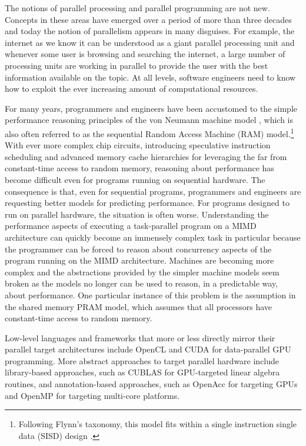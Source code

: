 \documentclass[oneside,11pt]{book}
\begin{document}
The notions of parallel processing and parallel programming are not
new. Concepts in these areas have emerged over a period of more than three
decades and today the notion of parallelism appears in many
disguises. For example, the internet as we know it can be understood
as a giant parallel processing unit and whenever some user is browsing
and searching the internet, a large number of processing units are
working in parallel to provide the user with the best information
available on the topic. At all levels, software engineers need to know
how to exploit the ever increasing amount of computational resources.

For many years, programmers and engineers have been accustomed to the
simple performance reasoning principles of the von Neumann machine
model \cite{vonneumann1945}, which is also often referred to as the
sequential Random Access Machine (RAM) model.\footnote{Following
  Flynn's taxonomy, this model fits within a single instruction single
  data (SISD) design \cite{Flynn1972}.} With ever more complex chip
circuits, introducing speculative instruction scheduling and advanced
memory cache hierarchies for leveraging the far from constant-time
access to random memory, reasoning about performance has become
difficult even for programs running on sequential hardware. The
consequence is that, even for sequential programs, programmers and
engineers are requesting better models for predicting performance. For
programs designed to run on parallel hardware, the situation is often
worse. Understanding the performance aspects of executing a
task-parallel program on a MIMD architecture can quickly become an
immensely complex task in particular because the programmer can be
forced to reason about concurrency aspects of the program running on
the MIMD architecture. Machines are becoming more complex and the
abstractions provided by the simpler machine models seem broken as the
models no longer can be used to reason, in a predictable way, about
performance. One particular instance of this problem is the assumption
in the shared memory PRAM model, which assumes that all processors
have constant-time access to random memory.

Low-level languages and frameworks that more or less directly mirror
their parallel target architectures include OpenCL \cite{opencl2011}
and CUDA \cite{Nickolls:2008:SPP:1365490.1365500} for data-parallel
GPU programming. More abstract approaches to target parallel hardware
include library-based approaches, such as CUBLAS for GPU-targeted
linear algebra routines, and annotation-based approaches, such as
OpenAcc for targeting GPUs and OpenMP for targeting multi-core
platforms.
\end{document}
